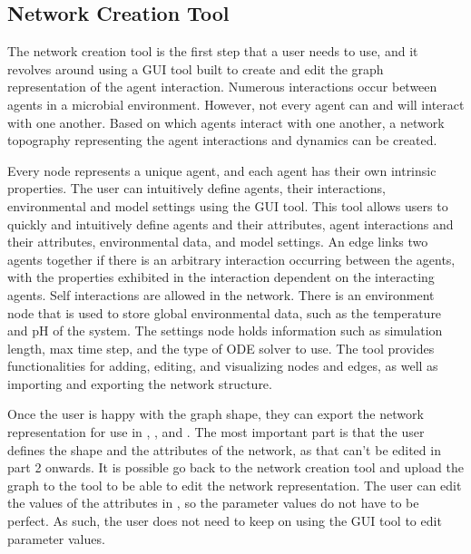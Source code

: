\subsection{Network Creation Tool}
\label{sec:network_creation_tool}
The network creation tool is the first step that a user needs to use, and it revolves around using a GUI tool built to create and edit the graph representation of the agent interaction.
Numerous interactions occur between agents in a microbial environment.
However, not every agent can and will interact with one another.
Based on which agents interact with one another, a network topography representing the agent interactions and dynamics can be created. 

Every node represents a unique agent, and each agent has their own intrinsic properties. 
The user can intuitively define agents, their interactions, environmental and model settings using the GUI tool. 
This tool allows users to quickly and intuitively define agents and their attributes, agent interactions and their attributes, environmental data, and model settings.
An edge links two agents together if there is an arbitrary interaction occurring between the agents, with the properties exhibited in the interaction dependent on the interacting agents. 
Self interactions are allowed in the network. 
There is an environment node that is used to store global environmental data, such as the temperature and pH of the system.
The settings node holds information such as simulation length, max time step, and the type of ODE solver to use.
The tool provides functionalities for adding, editing, and visualizing nodes and edges, as well as importing and exporting the network structure.  

Once the user is happy with the graph shape, they can export the network representation for use in , , and . 
The most important part is that the user defines the shape and the attributes of the network, as that can't be edited in part 2 onwards. 
It is possible go back to the network creation tool and upload the graph to the tool to be able to edit the network representation. \newline
The user can edit the values of the attributes in , so the parameter values do not have to be perfect. 
As such, the user does not need to keep on using the GUI tool to edit parameter values. 

